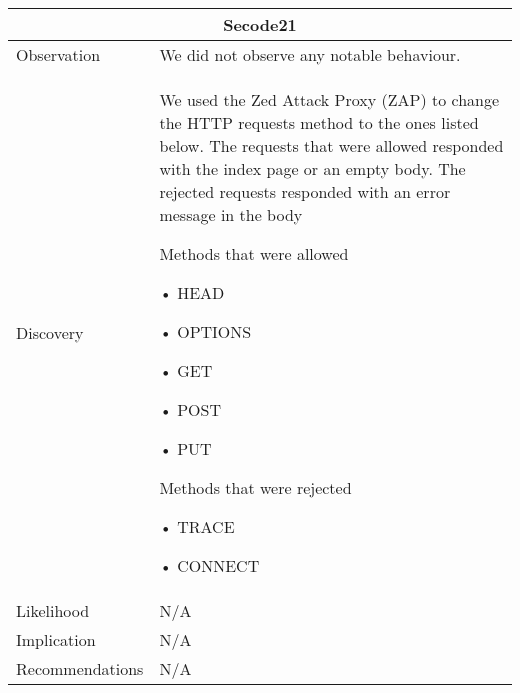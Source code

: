 \documentclass[headsepline,footsepline,footinclude=false,oneside,fontsize=11pt,paper=a4,listof=totoc,bibliography=totoc]{scrbook} %
\begin{document}
\begin{tabular}{ p{3cm}|p{13cm}  }
	\hline
	\multicolumn{2}{c}{Secode21} \\ 
	\hline
	Observation   &  We did not observe any notable behaviour.  \\
	
	Discovery  &   We used the Zed  Attack  Proxy  (ZAP)	to change the HTTP requests method
	to the ones listed below. The requests that were allowed responded
	with the index page or an empty body. The rejected requests responded with an
	error message in the body \
	
	Methods that were allowed\
	
	•	HEAD\
	
	•	OPTIONS\
	
	•	GET\
	
	•	POST\
	
	•	PUT  \
	
	Methods that were rejected\
	
	•	TRACE\
	
	•	CONNECT  \\
	
	
	Likelihood & N/A \\
	Implication    & N/A \\
	Recommendations& N/A \\ 
	
	\hline
\end{tabular}
\end{document}
